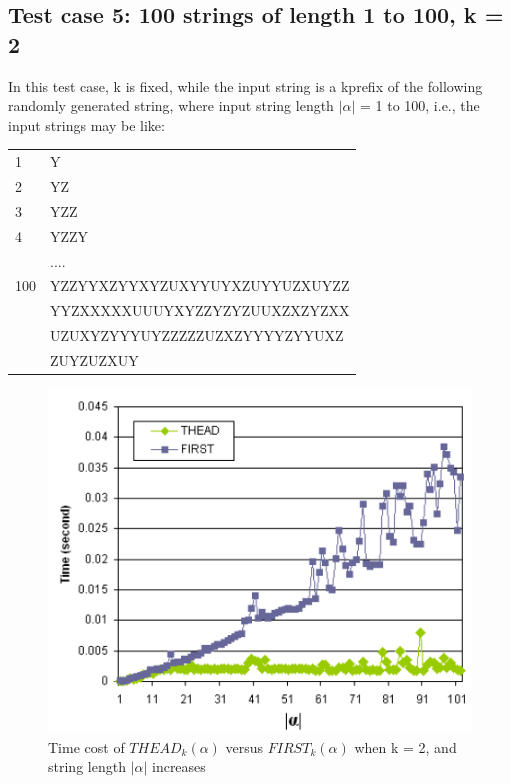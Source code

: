 \documentclass{sig-alternate-05-2015}
\begin{document}
\subsection{Test case 5: 100 strings of length 1 to 100, k = 2}
In this test case, k is fixed, while the input string is a kprefix
of the following randomly generated string, where
input string length $|\alpha|$ = 1 to 100, i.e., the input strings may
be like:\\
\begin{tabular}{ll}
1   & Y                                                                                                   \\
2   & YZ                                                                                                  \\
3   & YZZ                                                                                                 \\
4   & YZZY                                                                                                \\
    & ....                                                                                                \\
100 & YZZYYXZYYXYZUXYYUYXZUYYUZXUYZZ \\
      & YYZXXXXXUUUYXYZZYZYZUUXZXZYZXX \\
      & UZUXYZYYYUYZZZZZUZXZYYYYZYYUXZ \\
      & ZUYZUZXUY
\end{tabular}


\begin{figure}
\centering
\includegraphics[scale=0.5]{figure6.PNG}
\caption{Time cost of $THEAD_k(\alpha)$ versus $FIRST_k(\alpha)$
when k = 2, and string length $|\alpha|$ increases}
\label{fig:6}
\end{figure}
\end{document}
